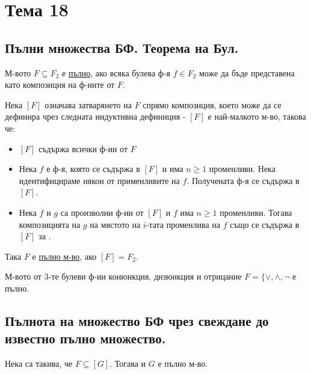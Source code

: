 \section{Тема 18}

\subsection{Пълни множества БФ. Теорема на Бул.}

\begin{definition}[неформално]
    М-вото \(F \subseteq F_2\) е \underline{пълно}, ако всяка булева ф-я \(f \in F_2\) може да бъде 
    представена като композиция на ф-иите от \(F\).
\end{definition}

\begin{definition}[формално]
    Нека \([F]\) означава затварянето на \(F\) спрямо композиция, което може да се дефинира чрез следната 
    индуктивна дефиниция - \([F]\) е най-малкото м-во, такова че:
    \begin{itemize}
        \item \([F]\) съдържа всички ф-ии от \(F\)
        \item Нека \(f\) е ф-я, която се съдържа в \([F]\) и има \(n \ge 1\) променливи. Нека 
        идентифицираме някои от применливите на \(f\). Получената ф-я се съдържа в \([F]\).
        \item Нека \(f\) и \(g\) са произволни ф-ии от \([F]\) и \(f\) има \(n \ge 1\) променливи. Тогава 
        композицията на \(g\) на мястото на \(i\)-тата променлива на \(f\) също се съдържа в \([F]\) за
        .
    \end{itemize}
    Така \(F\) е \underline{пълно м-во}, ако \([F] = F_2\).
\end{definition}

\begin{theorem}[на Бул]
    М-вото от 3-те булеви ф-ии конюнкция, дизюнкция и отрицание \(F = \{\vee, \land, \lnot\) е пълно.
\end{theorem}

\subsection{Пълнота на множество БФ чрез свеждане до известно пълно множество.}

\begin{lemma}
    Нека  са такива, че \(F \subseteq [G]\). Тогава \mexpr{[F] \subseteq [G]} и 
    \(G\) е пълно м-во.
\end{lemma}

